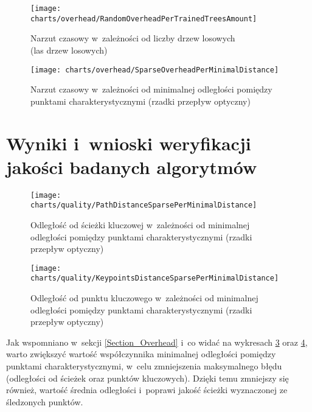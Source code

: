     \begin{figure}[!ht]
      \centering
      \texttt{[image: charts/overhead/RandomOverheadPerTrainedTreesAmount]}
      \caption[Narzut czasowy w~zależności od liczby drzew losowych]
              {Narzut czasowy w~zależności od liczby drzew losowych\\(las drzew losowych)}
      \label{fig:SpecialisedRandomOverhead}
    \end{figure}

    \begin{figure}[!ht]
      \centering
      \texttt{[image: charts/overhead/SparseOverheadPerMinimalDistance]}
      \caption[Narzut czasowy w~zależności od minimalnej odległości pomiędzy punktami charakterystycznymi]
              {Narzut czasowy w~zależności od minimalnej odległości pomiędzy punktami charakterystycznymi (rzadki przepływ optyczny)}
      \label{fig:SpecialisedSparseOverhead}
    \end{figure}

  \section{Wyniki i~wnioski weryfikacji jakości badanych algorytmów}\label{Section_Quality}

    \newpage
    \begin{figure}[!ht]
      \centering
      \texttt{[image: charts/quality/PathDistanceSparsePerMinimalDistance]}
      \caption[Odległość od ścieżki kluczowej w~zależności od minimalnej odległości pomiędzy punktami charakterystycznymi]
              {Odległość od ścieżki kluczowej w~zależności od minimalnej odległości pomiędzy punktami charakterystycznymi (rzadki przepływ optyczny)}
      \label{fig:SpecialisedSparsePathDistance}
    \end{figure}

    \begin{figure}[!ht]
      \centering
      \texttt{[image: charts/quality/KeypointsDistanceSparsePerMinimalDistance]}
      \caption[Odległość od punktu kluczowego w~zależności od minimalnej odległości pomiędzy punktami charakterystycznymi]
              {Odległość od punktu kluczowego w~zależności od minimalnej odległości pomiędzy punktami charakterystycznymi (rzadki przepływ optyczny)}
      \label{fig:SpecialisedSparseKeypointsDistance}
    \end{figure}

    Jak wspomniano w~sekcji \ref{Section_Overhead} i~co widać na wykresach \ref{fig:SpecialisedSparsePathDistance} oraz \ref{fig:SpecialisedSparseKeypointsDistance}, warto zwiększyć wartość współczynnika minimalnej odległości pomiędzy punktami charakterystycznymi, w~celu zmniejszenia maksymalnego błędu (odległości od ścieżek oraz punktów kluczowych). Dzięki temu zmniejszy się również, wartość średnia odległości i~poprawi jakość ścieżki wyznaczonej ze śledzonych punktów.

